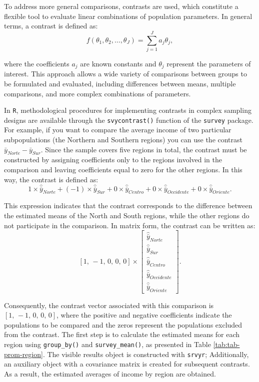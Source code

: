 \documentclass[
  english,
  12pt,
]{book}
\begin{document}
To address more general comparisons, contrasts are used, which constitute a flexible tool to evaluate linear combinations of population parameters. In general terms, a contrast is defined as:
\[
f\left(\theta_1,\theta_2,\ldots,\theta_J\right)
=
\sum_{j=1}^{J} a_j \theta_j,
\]

where the coefficients \(a_j\) are known constants and \(\theta_j\) represent the parameters of interest. This approach allows a wide variety of comparisons between groups to be formulated and evaluated, including differences between means, multiple comparisons, and more complex combinations of parameters.

In \texttt{R}, methodological procedures for implementing contrasts in complex sampling designs are available through the \texttt{svycontrast()} function of the \texttt{survey} package. For example, if you want to compare the average income of two particular subpopulations (the Northern and Southern regions) you can use the contrast \(\bar{y}_{Norte} - \bar{y}_{Sur}\). Since the sample covers five regions in total, the contrast must be constructed by assigning coefficients only to the regions involved in the comparison and leaving coefficients equal to zero for the other regions. In this way, the contrast is defined as:
\[
1\times\hat{\bar{y}}_{Norte}+\left(-1\right)\times\hat{\bar{y}}_{Sur}+0\times\hat{\bar{y}}_{Centro}+0\times\hat{\bar{y}}_{Occidente}+0\times\hat{\bar{y}}_{Oriente}.
\]

This expression indicates that the contrast corresponds to the difference between the estimated means of the North and South regions, while the other regions do not participate in the comparison. In matrix form, the contrast can be written as:
\[
 \left[1,\,-1,\,0,\,0,\,0\right]
 \times
 \left[\begin{array}{c}
\hat{\bar{y}}_{Norte}\\
\hat{\bar{y}}_{Sur}\\
\hat{\bar{y}}_{Centro}\\
\hat{\bar{y}}_{Occidente}\\
\hat{\bar{y}}_{Oriente}
\end{array}\right].
\]

Consequently, the contrast vector associated with this comparison is \(\left[1,\,-1,\,0,\,0,\,0\right]\), where the positive and negative coefficients indicate the populations to be compared and the zeros represent the populations excluded from the contrast. The first step is to calculate the estimated means for each region using \texttt{group\_by()} and \texttt{survey\_mean()}, as presented in Table \ref{tab:tab-prom-region}. The visible results object is constructed with \texttt{srvyr}; Additionally, an auxiliary object with a covariance matrix is created for subsequent contrasts. As a result, the estimated averages of income by region are obtained.
\end{document}
